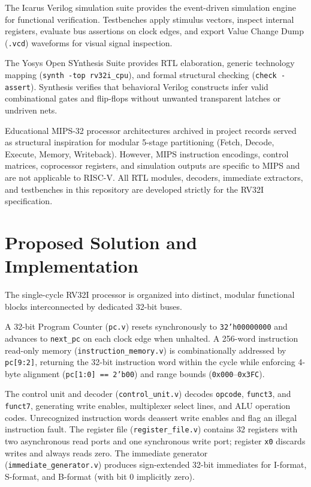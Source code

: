 \documentclass[conference]{IEEEtran}
\begin{document}
The Icarus Verilog simulation suite \cite{ref2} provides the event-driven simulation engine for functional verification. Testbenches apply stimulus vectors, inspect internal registers, evaluate bus assertions on clock edges, and export Value Change Dump (\texttt{.vcd}) waveforms for visual signal inspection.

The Yosys Open SYnthesis Suite \cite{ref3} provides RTL elaboration, generic technology mapping (\texttt{synth -top rv32i\_cpu}), and formal structural checking (\texttt{check -assert}). Synthesis verifies that behavioral Verilog constructs infer valid combinational gates and flip-flops without unwanted transparent latches or undriven nets.

Educational MIPS-32 processor architectures \cite{ref4} archived in project records served as structural inspiration for modular 5-stage partitioning (Fetch, Decode, Execute, Memory, Writeback). However, MIPS instruction encodings, control matrices, coprocessor registers, and simulation outputs are specific to MIPS and are not applicable to RISC-V. All RTL modules, decoders, immediate extractors, and testbenches in this repository are developed strictly for the RV32I specification.

\section{Proposed Solution and Implementation}
The single-cycle RV32I processor is organized into distinct, modular functional blocks interconnected by dedicated 32-bit buses.

A 32-bit Program Counter (\texttt{pc.v}) resets synchronously to \texttt{32'h00000000} and advances to \texttt{next\_pc} on each clock edge when unhalted. A 256-word instruction read-only memory (\texttt{instruction\_memory.v}) is combinationally addressed by \texttt{pc[9:2]}, returning the 32-bit instruction word within the cycle while enforcing 4-byte alignment (\texttt{pc[1:0] == 2'b00}) and range bounds (\texttt{0x000}--\texttt{0x3FC}).

The control unit and decoder (\texttt{control_unit.v}) decodes \texttt{opcode}, \texttt{funct3}, and \texttt{funct7}, generating write enables, multiplexer select lines, and ALU operation codes. Unrecognized instruction words deassert write enables and flag an illegal instruction fault. The register file (\texttt{register_file.v}) contains 32 registers with two asynchronous read ports and one synchronous write port; register \texttt{x0} discards writes and always reads zero. The immediate generator (\texttt{immediate_generator.v}) produces sign-extended 32-bit immediates for I-format, S-format, and B-format (with bit 0 implicitly zero).
\end{document}
